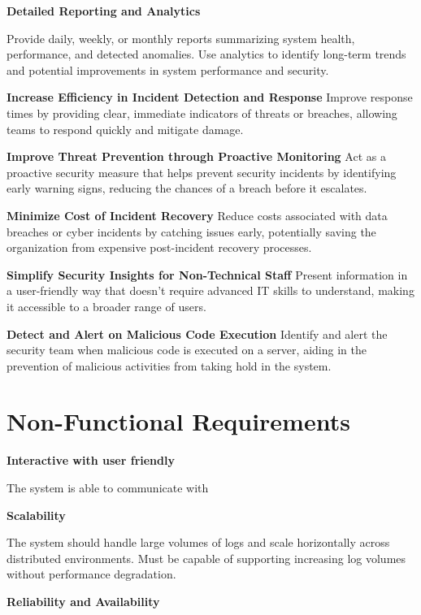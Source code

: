 \textbf{Detailed Reporting and Analytics}

Provide daily, weekly, or monthly reports summarizing system health, performance, and detected anomalies. Use analytics to identify long-term trends and potential improvements in system performance and security.

\textbf{Increase Efficiency in Incident Detection and Response}
Improve response times by providing clear, immediate indicators of threats or breaches, allowing teams to respond quickly and mitigate damage.

\textbf{Improve Threat Prevention through Proactive Monitoring}
Act as a proactive security measure that helps prevent security incidents by identifying early warning signs, reducing the chances of a breach before it escalates.

\textbf{Minimize Cost of Incident Recovery}
Reduce costs associated with data breaches or cyber incidents by catching issues early, potentially saving the organization from expensive post-incident recovery processes.

\textbf{Simplify Security Insights for Non-Technical Staff}
Present information in a user-friendly way that doesn’t require advanced IT skills to understand, making it accessible to a broader range of users.

\textbf{Detect and Alert on Malicious Code Execution}
Identify and alert the security team when malicious code is executed on a server, aiding in the prevention of malicious activities from taking hold in the system.





\section{Non-Functional Requirements}

\textbf{Interactive with user friendly }

The system is able to communicate with 

\textbf{Scalability}

The system should handle large volumes of logs and scale horizontally across distributed environments. Must be capable of supporting increasing log volumes without performance degradation.

\textbf{Reliability and Availability}

